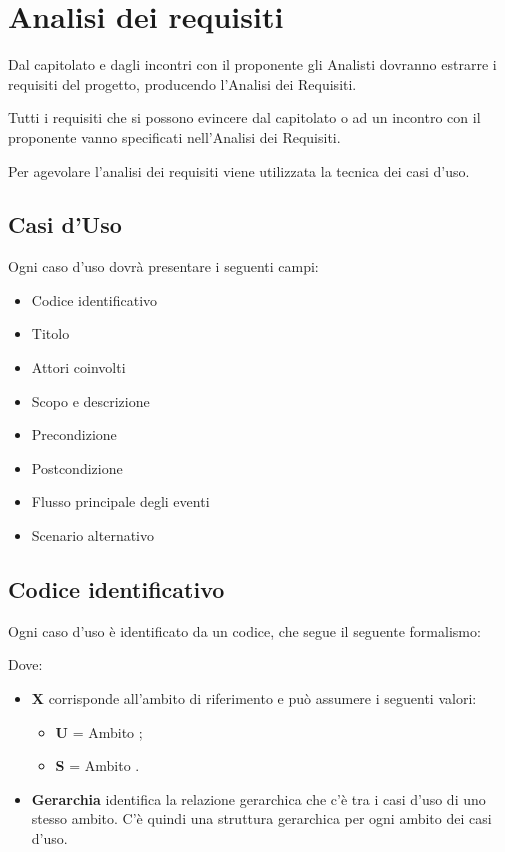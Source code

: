 \section{Analisi dei requisiti}

Dal capitolato e dagli incontri con il proponente gli Analisti dovranno estrarre i requisiti del progetto, producendo l'Analisi dei Requisiti.

Tutti i requisiti che si possono evincere dal capitolato o ad un incontro con il proponente vanno specificati nell'Analisi dei Requisiti.

Per agevolare l'analisi dei requisiti viene utilizzata la tecnica dei casi d'uso.

\subsection{Casi d'Uso}

Ogni caso d'uso dovrà presentare i seguenti campi:
\begin{itemize}
 \item Codice identificativo
 \item Titolo
 \item Attori coinvolti
 \item Scopo e descrizione
 \item Precondizione
 \item Postcondizione
 \item Flusso principale degli eventi
 \item Scenario alternativo
\end{itemize}

\subsection{Codice identificativo}

Ogni caso d'uso è identificato da un codice, che segue il seguente formalismo:
\begin{center}
\end{center}

Dove:
\begin{itemize}
 \item \textbf{X} corrisponde all'ambito di riferimento e può assumere i seguenti valori:
	\begin{itemize}
	 \item[] \textbf{U} = Ambito ;
	 \item[] \textbf{S} = Ambito .
	\end{itemize}

	 \item \textbf{Gerarchia} identifica la relazione gerarchica che c'è tra i casi d'uso di uno stesso ambito. C'è quindi una struttura gerarchica per ogni ambito dei casi d'uso.
\end{itemize}

